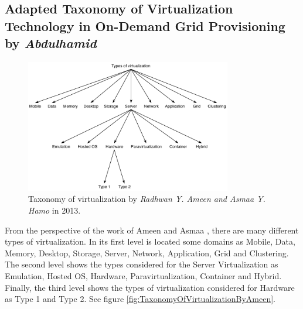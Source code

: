 	\subsection{Adapted Taxonomy of Virtualization Technology in On-Demand Grid Provisioning by \textit{Abdulhamid}}
	
	\begin{figure}[H]
		\centering
		\includegraphics[width=9cm]{images/AmeenAndHamo2003.pdf}
		\vspace{-0.2cm}
		\caption{Taxonomy of virtualization by \textit{Radhwan Y. Ameen and Asmaa Y. Hamo} in 2013\footnotemark[200]{}.}
		\label{fig:TaxonomyOfVirtualizationBugnion}
	\end{figure}
	

    From the perspective of the work of Ameen and Asmaa \cite{Ameen2013}, there are many different types of virtualization. In its first level is located some domains as  Mobile, Data, Memory, Desktop, Storage, Server, Network, Application, Grid and Clustering. The second level shows the types considered for the Server Virtualization as Emulation, Hosted OS, Hardware, Paravirtualization, Container and Hybrid. Finally, the third level shows the types of virtualization considered for Hardware as Type 1 and Type 2. See figure \ref{fig:TaxonomyOfVirtualizationByAmeen}.
  
